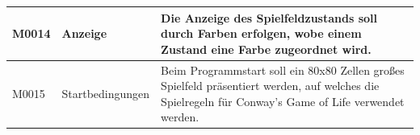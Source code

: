 \documentclass[11pt,a4paper]{article}
\begin{document}
\begin{longtable}[m]{|m{2.2cm}|m{4cm}|m{8cm}|}
\hline
M0014 & Anzeige & Die Anzeige des Spielfeldzustands soll durch Farben erfolgen, wobe einem Zustand eine Farbe zugeordnet wird.\\
\hline
M0015 & Startbedingungen & Beim Programmstart soll ein 80x80 Zellen großes Spielfeld präsentiert werden, auf welches die Spielregeln für Conway's Game of Life verwendet werden. \\

\hline
\end{longtable}    
\newpage

\end{document}

